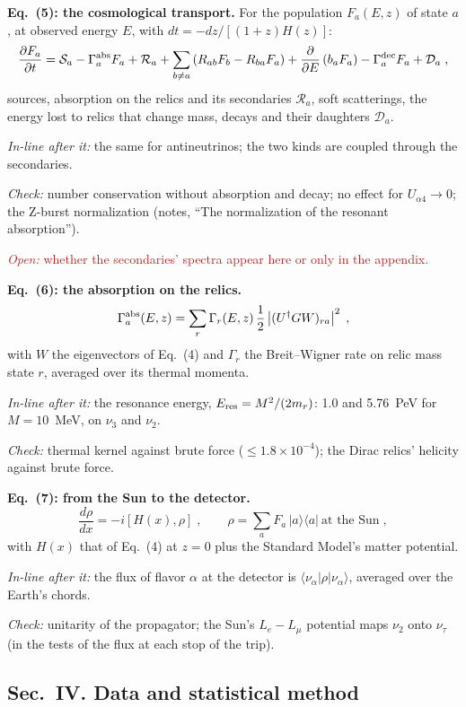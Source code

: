 \documentclass[11pt]{article}
\newcommand{\checked}[1]{\par\noindent\textit{Check:} #1}
\newcommand{\inline}[1]{\par\noindent\textit{In-line after it:} #1}
\newcommand{\open}[1]{\par\noindent\textcolor{firebrick}{\textit{Open:} #1}}
\begin{document}
\textbf{Eq.~(5): the cosmological transport.}
For the population $F_a(E, z)$ of state $a$, at observed energy $E$, with $dt = -dz / [(1+z) H(z)]$:
\begin{equation}
 \frac{\partial F_a}{\partial t} = \mathcal{S}_a - \Gamma^{\rm abs}_a F_a + \mathcal{R}_a
 + \sum_{b \neq a} \left( R_{ab} F_b - R_{ba} F_a \right) + \frac{\partial}{\partial E}\left( b_a F_a \right)
 - \Gamma^{\rm dec}_a F_a + \mathcal{D}_a \;,
\end{equation}
sources, absorption on the relics and its secondaries $\mathcal{R}_a$, soft scatterings, the energy lost to relics that change mass, decays and their daughters $\mathcal{D}_a$.
\inline{the same for antineutrinos; the two kinds are coupled through the secondaries.}
\checked{number conservation without absorption and decay; no effect for $U_{\alpha 4} \to 0$; the Z-burst normalization (notes, ``The normalization of the resonant absorption'').}
\open{whether the secondaries' spectra appear here or only in the appendix.}

\textbf{Eq.~(6): the absorption on the relics.}
\begin{equation}
 \Gamma^{\rm abs}_a(E, z) = \sum_r \Gamma_r(E, z)\, \frac12 \left| (U^\dagger G W)_{ra} \right|^2 \;,
\end{equation}
with $W$ the eigenvectors of Eq.~(4) and $\Gamma_r$ the Breit--Wigner rate on relic mass state $r$, averaged over its thermal momenta.
\inline{the resonance energy, $E_{\rm res} = M^2 / (2 m_r)$: 1.0 and 5.76~PeV for $M = 10$~MeV, on $\nu_3$ and $\nu_2$.}
\checked{thermal kernel against brute force ($\leq 1.8 \times 10^{-4}$); the Dirac relics' helicity against brute force.}

\textbf{Eq.~(7): from the Sun to the detector.}
\begin{equation}
 \frac{d\rho}{dx} = -i \left[ H(x), \rho \right] \;, \qquad \rho = \sum_a F_a\, |a\rangle\langle a| \ \text{at the Sun} \;,
\end{equation}
with $H(x)$ that of Eq.~(4) at $z = 0$ plus the Standard Model's matter potential.
\inline{the flux of flavor $\alpha$ at the detector is $\langle\nu_\alpha|\rho|\nu_\alpha\rangle$, averaged over the Earth's chords.}
\checked{unitarity of the propagator; the Sun's $L_e - L_\mu$ potential maps $\nu_2$ onto $\nu_\tau$ (in the tests of the flux at each stop of the trip).}

\subsection*{Sec.~IV. Data and statistical method}
\end{document}
